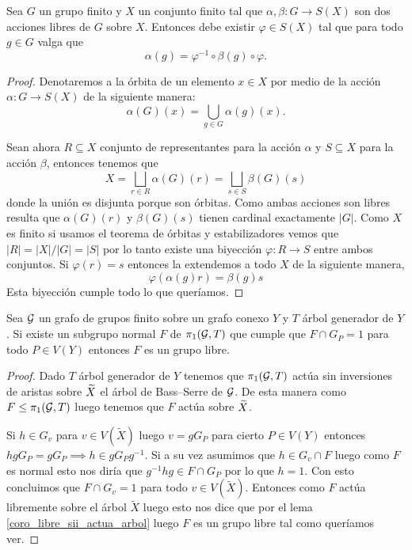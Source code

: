 \documentclass[tesis.tex]{subfiles}
\begin{document}
\begin{lema}\label{lema_acciones_finitas}
	Sea $G$ un grupo finito y $X$ un conjunto finito tal que $\alpha, \beta : G \to S(X)$ son dos acciones libres de $G$ sobre $X$. 
	Entonces debe existir $\varphi \in S(X)$ tal que para todo $g \in G$ valga que 
	\[
	\alpha (g) = \varphi^{-1} \circ \beta(g) \circ \varphi.
	\]
\end{lema}
\begin{proof}
	Denotaremos a la órbita de un elemento $x \in X$ por medio de la acción $\alpha:G \to S(X)$ de la siguiente manera:
	\[
		\alpha(G)(x) = \bigcup_{g \in G} \alpha(g) (x).
	\]
	
	Sean ahora $R \subseteq X$ conjunto de representantes para la acción $\alpha$ y $S \subseteq X$ para la acción $\beta$, entonces tenemos que
	\[
		X = \bigsqcup_{r \in R} \alpha(G) (r) = \bigsqcup_{s \in S} \beta(G) (s)
	\]
	donde la unión es disjunta porque son órbitas. 
	Como ambas acciones son libres resulta que $\alpha(G)(r)$ y $\beta(G)(s)$ tienen cardinal exactamente $|G|$.
	Como $X$ es finito si usamos el teorema de órbitas y estabilizadores vemos que $|R| = |X| / |G| = |S|$ por lo tanto existe una biyección $\varphi: R \to S$ entre ambos conjuntos.
	Si $\varphi(r) = s$ entonces la extendemos a todo $X$ de la siguiente manera,
	\[
		\varphi (\alpha(g) r) = \beta(g)  s
	\]
	Esta biyección cumple todo lo que queríamos.
	
\end{proof}


\begin{teo}
	\label{teo:subgrupo_normal_pi1_libre}
	Sea ${\cal G}$ un grafo de grupos finito sobre un grafo conexo $Y$ y $T$ árbol generador de $Y$.
	Si existe un subgrupo normal $F$ de $\pi_{1}({\cal G},T)$ que cumple que $F \cap G_{P} = 1$ para todo $P \in V(Y)$ entonces $F$ es un grupo libre.
\end{teo}
\begin{proof}
	Dado $T$ árbol generador de $Y$ tenemos que $\pi_1({\cal G}, T)$ actúa sin inversiones de aristas sobre $\widetilde X$ el árbol de Bass--Serre de ${\cal G}$.
	De esta manera como $F \le \pi_1({\cal G},T)$ luego tenemos que $F$ actúa sobre $\widetilde X$.

	Si $h \in G_v$ para $v \in V(\widetilde{X})$ luego $v = gG_{P}$ para cierto $P \in V(Y)$ entonces 
	$hgG_{P} = gG_{P} \implies h \in gG_{P}g^{-1}$.
	Si a su vez asumimos que $h \in G_{v} \cap F$ luego como $F$ es normal esto nos diría que $g^{-1}hg \in F \cap G_{P}$ por lo que $h = 1$.
	Con esto concluimos que $F \cap G_{v} = 1$ para todo $v \in V(\widetilde{X})$. 
	Entonces como $F$ actúa libremente sobre el árbol $\widetilde{X}$ luego esto nos dice que por el lema \ref{coro_libre_sii_actua_arbol} luego $F$ es un grupo libre tal como queríamos ver.
\end{proof}
\end{document}
